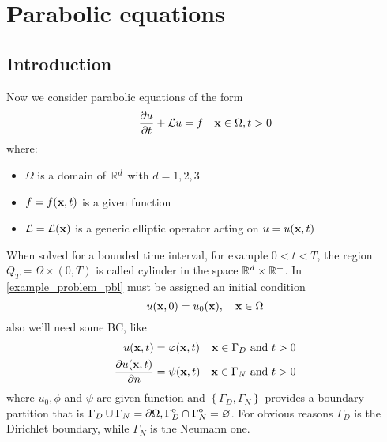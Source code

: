 \newpage
\section{Parabolic equations}
\subsection{Introduction}
Now we consider parabolic equations of the form
\begin{equation}
    \partialderivative{u}{t} + \loperator u = f \quad \vect{x} \in \Omega, t>0
    \label{example_problem_pbl}
\end{equation}
where: 
\begin{itemize}
    \item \(\Omega\) is a domain of \(\mathbb{R}^d\) with \(d = 1,2,3\)
    \item \(f = f(\textbf{x}, t)\) is a given function 
    \item \(\mathcal{L} = \mathcal{L} (\textbf{x})\) is a generic elliptic operator acting on \(u = u(\textbf{x}, t)\)
\end{itemize}
When solved for a bounded time interval, for example \(0 < t < T\), the region \(Q_T = \Omega \times (0,T)\) is called cylinder in the space \(\mathbb{R}^d \times \mathbb{R}^+\). 
In \eqref{example_problem_pbl} must be assigned an initial condition 
\begin{equation}
    u(\textbf{x}, 0) = u_0(\textbf{x}),\quad \textbf{x} \in \Omega
    \label{initial_cond_pbl}
\end{equation}
also we'll need some BC, like 
\begin{equation}
    \begin{aligned}
        u(\xvec, t) &= \phi(\xvec, t) & \xvec \in \Gamma_D \txt{ and } t > 0 \\
        \partialderivative{u(\xvec, t)}{n} &=\psi(\xvec, t) & \xvec \in \Gamma_N \txt{ and } t > 0 
    \end{aligned}
    \label{BC_example_pbl}
\end{equation}
where \(u_0, \phi\) and \(\psi\) are given function and \(\left\{ \Gamma_D, \Gamma_N \right\}\) provides a boundary partition that is \(\Gamma_D \cup \Gamma_N = {\partial\Omega}, {\kern0pt\Gamma}^{\mathrm{o}}_D \cap {\kern0pt\Gamma}^{\mathrm{o}}_N = \varnothing\). For obvious reasons \(\Gamma_D\) is the Dirichlet boundary, while \(\Gamma_N\) is the Neumann one.

